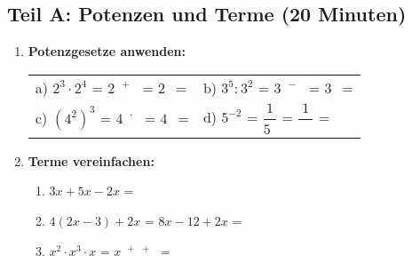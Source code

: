 \subsection*{Teil A: Potenzen und Terme (20 Minuten)}

\begin{enumerate}[label=\arabic*.]

    \item \textbf{Potenzgesetze anwenden:}
    \vspace{0.5cm}

    \begin{tabular}{ll}
        a) $2^3 \cdot 2^4$ = $2^{\phantom{0}+\phantom{0}}$ = $2^{\phantom{0}}$ = \underline{\hspace{2cm}} & b) $3^5 : 3^2$ = $3^{\phantom{0}-\phantom{0}}$ = $3^{\phantom{0}}$ = \underline{\hspace{2cm}} \\[3ex]
        c) $(4^2)^3$ = $4^{\phantom{0} \cdot \phantom{0}}$ = $4^{\phantom{0}}$ = \underline{\hspace{2cm}} & d) $5^{-2}$ = $\dfrac{1}{5^{\phantom{0}}}$ = $\dfrac{1}{\phantom{00}}$ = \underline{\hspace{2cm}}
    \end{tabular}

    \vspace{1cm}

    \item \textbf{Terme vereinfachen:}
    \vspace{0.5cm}

    \begin{enumerate}[label=\alph*)]
        \item $3x + 5x - 2x$ = \underline{\hspace{3cm}}
        \vspace{0.3cm}

        \item $4(2x - 3) + 2x$ = $8x - 12 + 2x$ = \underline{\hspace{3cm}}
        \vspace{0.3cm}

        \item $x^2 \cdot x^3 \cdot x$ = $x^{\phantom{0}+\phantom{0}+\phantom{0}}$ = \underline{\hspace{3cm}}
    \end{enumerate}

\end{enumerate}
